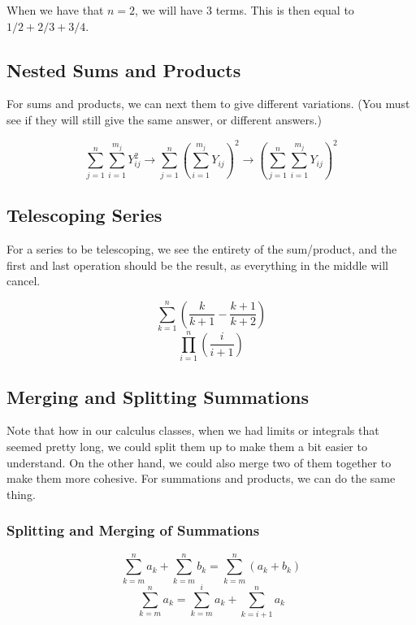 When we have that $n = 2$, we will have 3 terms. This is then equal to $1/2+2/3+3/4$.


\subsection{Nested Sums and Products}
For sums and products, we can next them to give different variations. (You must see if they will still give the same answer, or different answers.)

\begin{displaymath}
    \sum_{j=1}^{n}\sum_{i=1}^{m_j}Y_{ij}^2 \longrightarrow \sum_{j=1}^{n}(\sum_{i=1}^{m_j}Y_{ij})^2 \longrightarrow (\sum_{j=1}^{n}\sum_{i=1}^{m_j}Y_{ij})^2
\end{displaymath}

\subsection{Telescoping Series}
For a series to be telescoping, we see the entirety of the sum/product, and the first and last operation should be the result, as everything in the middle will cancel.

\begin{displaymath}
    \sum_{k=1}^{n}(\frac{k}{k+1}-\frac{k+1}{k+2})
\end{displaymath}
\begin{displaymath}
    \prod_{i=1}^{n}(\frac{i}{i+1})
\end{displaymath}

\subsection{Merging and Splitting Summations}
Note that how in our calculus classes, when we had limits or integrals that seemed pretty long, we could split them up to make them a bit easier to understand. On the other hand, we could also merge two of them together to make them more cohesive. For summations and products, we can do the same thing.

\subsubsection{Splitting and Merging of Summations}
\begin{displaymath}
    \sum_{k=m}^{n}a_k+\sum_{k=m}^{n}b_k=\sum_{k=m}^{n}(a_k+b_k)
\end{displaymath}
\begin{displaymath}
    \sum_{k=m}^{n}a_k=\sum_{k=m}^{i}a_k+\sum_{k=i+1}^{n}a_k
\end{displaymath}

